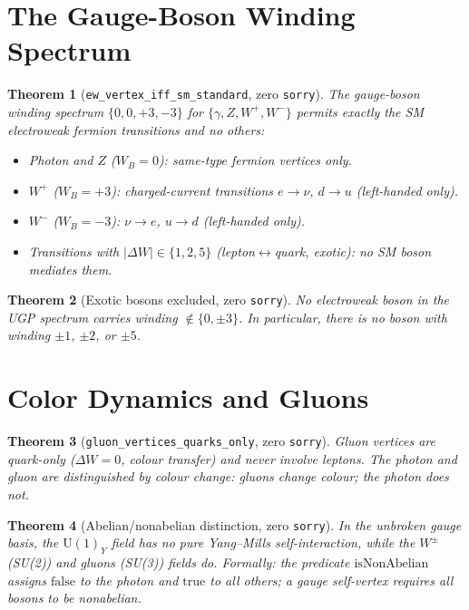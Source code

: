 \documentclass[12pt]{article}
\newtheorem{theorem}{Theorem}[section]
\theoremstyle{remark}
\newcommand{\sorry}{\texttt{sorry}}
\newcommand{\lean}[1]{\texttt{#1}}
\begin{document}
\section{The Gauge-Boson Winding Spectrum}
\label{sec:bosons}

\begin{theorem}[\lean{ew\_vertex\_iff\_sm\_standard}, zero \sorry]
\label{thm:ewspectrum}
The gauge-boson winding spectrum $\{0, 0, +3, -3\}$ for $\{\gamma, Z, W^+, W^-\}$
permits exactly the SM electroweak fermion transitions and no others:
\begin{itemize}
  \item Photon and $Z$ ($W_B = 0$): same-type fermion vertices only.
  \item $W^+$ ($W_B = +3$): charged-current transitions $e \to \nu$, $d \to u$
    (left-handed only).
  \item $W^-$ ($W_B = -3$): $\nu \to e$, $u \to d$ (left-handed only).
  \item Transitions with $|\Delta W| \in \{1, 2, 5\}$ (lepton$\leftrightarrow$quark,
    exotic): no SM boson mediates them.
\end{itemize}
\end{theorem}

\begin{theorem}[Exotic bosons excluded, zero \sorry]
No electroweak boson in the UGP spectrum carries winding $\notin \{0, \pm 3\}$.
In particular, there is no boson with winding $\pm 1$, $\pm 2$, or $\pm 5$.
\end{theorem}

\section{Color Dynamics and Gluons}
\label{sec:color}

\begin{theorem}[\lean{gluon\_vertices\_quarks\_only}, zero \sorry]
Gluon vertices are quark-only ($\Delta W = 0$, colour transfer) and never
involve leptons.  The photon and gluon are distinguished by colour change:
gluons change colour; the photon does not.
\end{theorem}

\begin{theorem}[Abelian/nonabelian distinction, zero \sorry]
\label{thm:nonabelian}
In the \emph{unbroken gauge basis}, the $\mathrm{U}(1)_Y$ field has no pure
Yang--Mills self-interaction, while the $W^\pm$ (SU(2)) and gluons (SU(3))
fields do.  Formally: the predicate $\mathrm{isNonAbelian}$ assigns
$\mathrm{false}$ to the photon and $\mathrm{true}$ to all others; a gauge
self-vertex requires all bosons to be nonabelian.
\end{theorem}
\end{document}
